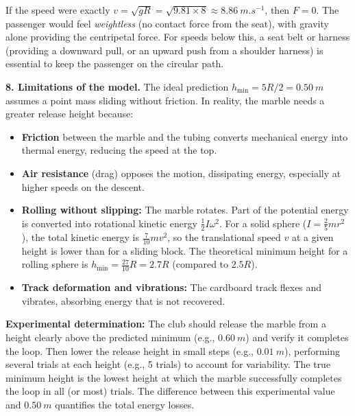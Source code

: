 \documentclass[11pt]{article}
\begin{document}
If the speed were exactly $v = \sqrt{gR} = \sqrt{9.81 \times 8} \approx \SI{8.86}{m.s^{-1}}$, then $F = 0$. The passenger would feel \emph{weightless} (no contact force from the seat), with gravity alone providing the centripetal force. For speeds below this, a seat belt or harness (providing a downward pull, or an upward push from a shoulder harness) is essential to keep the passenger on the circular path.

\textbf{8. Limitations of the model.} The ideal prediction $h_{\min} = 5R/2 = \SI{0.50}{m}$ assumes a point mass sliding without friction. In reality, the marble needs a greater release height because:
\begin{itemize}
\item \textbf{Friction} between the marble and the tubing converts mechanical energy into thermal energy, reducing the speed at the top.
\item \textbf{Air resistance} (drag) opposes the motion, dissipating energy, especially at higher speeds on the descent.
\item \textbf{Rolling without slipping:} The marble rotates. Part of the potential energy is converted into rotational kinetic energy $\frac{1}{2}I\omega^2$. For a solid sphere ($I = \frac{2}{5}mr^2$), the total kinetic energy is $\frac{7}{10}mv^2$, so the translational speed $v$ at a given height is lower than for a sliding block. The theoretical minimum height for a rolling sphere is $h_{\min} = \frac{27}{10}R = 2.7R$ (compared to $2.5R$).
\item \textbf{Track deformation and vibrations:} The cardboard track flexes and vibrates, absorbing energy that is not recovered.
\end{itemize}
\textbf{Experimental determination:} The club should release the marble from a height clearly above the predicted minimum (e.g., $\SI{0.60}{m}$) and verify it completes the loop. Then lower the release height in small steps (e.g., $\SI{0.01}{m}$), performing several trials at each height (e.g., 5 trials) to account for variability. The true minimum height is the lowest height at which the marble successfully completes the loop in all (or most) trials. The difference between this experimental value and $\SI{0.50}{m}$ quantifies the total energy losses.
\end{document}
